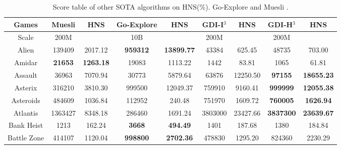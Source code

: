 \documentclass[nohyperref]{article}
\theoremstyle{plain}
\begin{document}
\begin{table}[!hb]
\footnotesize
\begin{center}
\caption{Score table of other SOTA algorithms on HNS(\%). Go-Explore \citep{goexplore} and Muesli \citep{muesli}.}
\label{Tab:Score table of other SOTA algorithms on HNS.}
\setlength{\tabcolsep}{1.0pt}
\begin{tabular}{|c |c c| c c| c c |c c|}            
\hline
 Games        & Muesli & HNS      & Go-Explore              & HNS                     & GDI-I$^3$ & HNS               & GDI-H$^3$ & HNS \\
\hline
Scale         &  200M   &            & 10B                     &                             & 200M              &                &  200M   &\\
\hline
 Alien        &139409          &2017.12                   &\textbf{959312}       &\textbf{13899.77}              & 43384             &625.45            &48735	             &703.00              \\
 Amidar       &\textbf{21653}  &\textbf{1263.18}          &19083                 &1113.22                        & 1442              &83.81             &1065              &61.81           \\
 Assault      &36963           &7070.94                   &30773                 &5879.64                        & 63876      &12250.50   &\textbf{97155	}    &\textbf{18655.23}       \\
 Asterix      &316210          &3810.30                   &999500       &12049.37              & 759910            &9160.41           &\textbf{999999}    &\textbf{12055.38}\\
 Asteroids    &484609          &1036.84                   &112952                &240.48                         & 751970     &1609.72    &\textbf{760005}            &\textbf{1626.94}       \\
 Atlantis     &1363427         &8348.18                   &286460                &1691.24                        & 3803000    &23427.66   &\textbf{3837300}           &\textbf{23639.67}       \\
 Bank Heist   &1213            &162.24                    &\textbf{3668}         &\textbf{494.49}                & 1401              &187.68            &1380              &184.84\\
 Battle Zone  &414107          &1120.04                   &\textbf{998800}       &\textbf{2702.36}               & 478830            &1295.20           &824360            &2230.29\\

\end{tabular}
\end{center}
\end{table}
\end{document}
